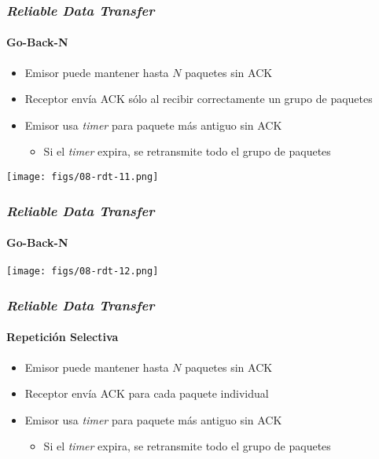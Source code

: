 \documentclass[letter]{beamer}
\begin{document}
\begin{frame}
  \frametitle{{\em Reliable Data Transfer}}
  \framesubtitle{Go-Back-N}
  
  \begin{itemize}
    \item Emisor puede mantener hasta $N$ paquetes sin ACK
    \item Receptor envía ACK sólo al recibir correctamente un grupo de paquetes
    \item Emisor usa {\em timer} para paquete más antiguo sin ACK
      \begin{itemize}
        \item Si el {\em timer} expira, se retransmite todo el grupo de paquetes
      \end{itemize}
  \end{itemize}

  \begin{center}
    \texttt{[image: figs/08-rdt-11.png]}
  \end{center}

\end{frame}
\begin{frame}
  \frametitle{{\em Reliable Data Transfer}}
  \framesubtitle{Go-Back-N}

  \begin{center}
    \texttt{[image: figs/08-rdt-12.png]}
  \end{center}


\end{frame}
\begin{frame}
  \frametitle{{\em Reliable Data Transfer}}
  \framesubtitle{Repetición Selectiva}
  
  \begin{itemize}
    \item Emisor puede mantener hasta $N$ paquetes sin ACK
    \item Receptor envía ACK para cada paquete individual
    \item Emisor usa {\em timer} para paquete más antiguo sin ACK
      \begin{itemize}
        \item Si el {\em timer} expira, se retransmite todo el grupo de paquetes
      \end{itemize}
  \end{itemize}

\end{frame}
\end{document}
